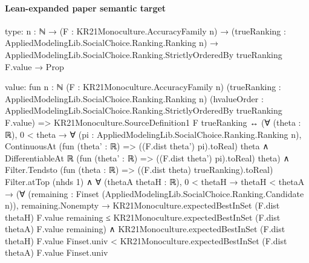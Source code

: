 \documentclass[10pt]{article}
\begin{document}
\paragraph{Lean-expanded paper semantic target}
\begin{ReviewVerbatim}
type:
{n : ℕ} →
  (F : KR21Monoculture.AccuracyFamily n) →
    (trueRanking : AppliedModelingLib.SocialChoice.Ranking.Ranking n) →
      AppliedModelingLib.SocialChoice.Ranking.StrictlyOrderedBy trueRanking F.value → Prop

value:
fun {n : ℕ} (F : KR21Monoculture.AccuracyFamily n) (trueRanking : AppliedModelingLib.SocialChoice.Ranking.Ranking n)
    (hvalueOrder : AppliedModelingLib.SocialChoice.Ranking.StrictlyOrderedBy trueRanking F.value) =>
  KR21Monoculture.SourceDefinition1 F trueRanking ↔
    (∀ (theta : ℝ),
        0 < theta →
          ∀ (pi : AppliedModelingLib.SocialChoice.Ranking.Ranking n),
            ContinuousAt (fun (theta' : ℝ) => ((F.dist theta') pi).toReal) theta ∧
              DifferentiableAt ℝ (fun (theta' : ℝ) => ((F.dist theta') pi).toReal) theta) ∧
      Filter.Tendsto (fun (theta : ℝ) => ((F.dist theta) trueRanking).toReal) Filter.atTop (nhds 1) ∧
        ∀ (thetaA thetaH : ℝ),
          0 < thetaH →
            thetaH < thetaA →
              (∀ (remaining : Finset (AppliedModelingLib.SocialChoice.Ranking.Candidate n)),
                  remaining.Nonempty →
                    KR21Monoculture.expectedBestInSet (F.dist thetaH) F.value remaining ≤
                      KR21Monoculture.expectedBestInSet (F.dist thetaA) F.value remaining) ∧
                KR21Monoculture.expectedBestInSet (F.dist thetaH) F.value Finset.univ <
                  KR21Monoculture.expectedBestInSet (F.dist thetaA) F.value Finset.univ
\end{ReviewVerbatim}
\end{document}
